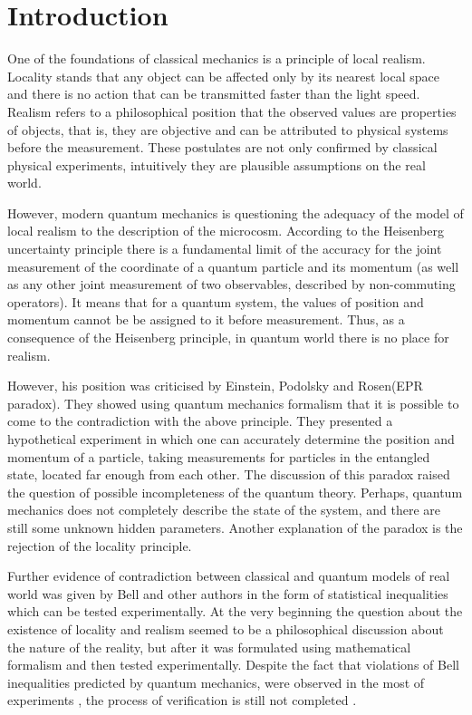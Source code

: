 \documentclass[11pt]{article}
\begin{document}
\section{Introduction}
One of the foundations of classical mechanics is a principle of local realism. Locality stands that any object can be affected only by its nearest local space and there is no action that can be transmitted faster than the light speed. Realism refers to a philosophical position that the observed values are properties of objects, that is, they are objective and can be attributed to physical systems before the measurement. These postulates are not only confirmed by classical physical experiments, intuitively they are plausible assumptions on the real world.

However, modern quantum mechanics is questioning the adequacy of the model of local realism to the description of the microcosm. According to the Heisenberg uncertainty principle there is a fundamental limit of the accuracy for the joint measurement of the coordinate of a quantum particle and its momentum (as well as any other joint measurement of two observables, described by non-commuting operators). It means that for a quantum system, the values of position and momentum cannot be be assigned to it before measurement. Thus, as a consequence of the Heisenberg principle, in quantum world there is no place for realism.

However, his position was criticised by Einstein, Podolsky and Rosen(EPR paradox)\cite{EPR}. They showed using quantum mechanics formalism that it is possible to come to the contradiction with the above principle. They presented a hypothetical experiment in which one can accurately determine the position and momentum of a particle, taking measurements for particles in the entangled state, located far enough from each other. The discussion of this paradox raised the question of possible incompleteness of the quantum theory. Perhaps, quantum mechanics does not completely describe the state of the system, and there are still some unknown hidden parameters. Another explanation of the paradox is the rejection of the locality principle.

Further evidence of contradiction between classical and quantum models of real world was given by Bell and other authors in the form of statistical inequalities which can be tested experimentally. At the very beginning the question about the existence of locality and realism seemed to be a philosophical discussion about the nature of the reality, but after it was formulated using mathematical formalism and then tested experimentally. Despite the fact that violations of Bell inequalities predicted by quantum mechanics, were observed in the most of experiments \cite {ASP1}, the process of verification is still not completed \cite {Khrennikov_preprint}.
\end{document}
